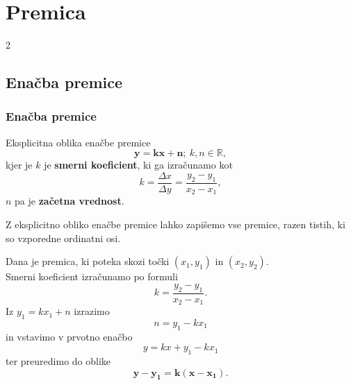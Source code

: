\section{Premica}

\begin{frame}
    \sectionpage
\end{frame}

\begin{frame}
    \begin{multicols}{2}
    \end{multicols}
\end{frame}
        


    \subsection{Enačba premice}

        \begin{frame}
            \frametitle{Enačba premice}

            \begin{alertblock}{Eksplicitna oblika enačbe premice}
                $$ \mathbf{y=kx+n};~ k,n\in\mathbb{R},$$
                kjer je $k$ je \textbf{smerni koeficient}, ki ga izračunamo kot $$k=\dfrac{\Delta x}{\Delta y}=\dfrac{y_2-y_1}{x_2-x_1},$$                
                $n$ pa je \textbf{začetna vrednost}.
            \end{alertblock}

            \begin{block}{}
                Z eksplicitno obliko enačbe premice lahko zapišemo vse premice, razen tistih, ki so vzporedne ordinatni osi.
            \end{block}
        \end{frame}

        \begin{frame}
            \begin{block}{}
                Dana je premica, ki poteka skozi točki $(x_1,y_1)$ in $(x_2,y_2)$. \\
                Smerni koeficient izračunamo po formuli $$k=\dfrac{y_2-y_1}{x_2-x_1}.$$
                Iz $y_1=kx_1+n$ izrazimo $$n=y_1-kx_1$$
                in vstavimo v prvotno enačbo $$y=kx+y_1-kx_1$$
                ter preuredimo do oblike $$\mathbf{y-y_1=k(x-x_1)}.$$
            \end{block}
        \end{frame}


